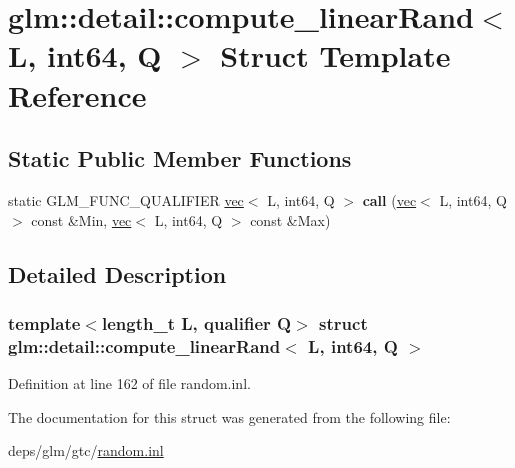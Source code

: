 \hypertarget{structglm_1_1detail_1_1compute__linearRand_3_01L_00_01int64_00_01Q_01_4}{}\section{glm\+:\+:detail\+:\+:compute\+\_\+linear\+Rand$<$ L, int64, Q $>$ Struct Template Reference}
\label{structglm_1_1detail_1_1compute__linearRand_3_01L_00_01int64_00_01Q_01_4}
\subsection*{Static Public Member Functions}
\begin{DoxyCompactItemize}
\item 
\mbox{\label{structglm_1_1detail_1_1compute__linearRand_3_01L_00_01int64_00_01Q_01_4_a228cd2fef53b8af89955bc01dfde047a}} 
static G\+L\+M\+\_\+\+F\+U\+N\+C\+\_\+\+Q\+U\+A\+L\+I\+F\+I\+ER \hyperlink{structglm_1_1vec}{vec}$<$ L, int64, Q $>$ {\bfseries call} (\hyperlink{structglm_1_1vec}{vec}$<$ L, int64, Q $>$ const \&Min, \hyperlink{structglm_1_1vec}{vec}$<$ L, int64, Q $>$ const \&Max)
\end{DoxyCompactItemize}


\subsection{Detailed Description}
\subsubsection*{template$<$length\+\_\+t L, qualifier Q$>$\newline
struct glm\+::detail\+::compute\+\_\+linear\+Rand$<$ L, int64, Q $>$}



Definition at line 162 of file random.\+inl.



The documentation for this struct was generated from the following file\+:\begin{DoxyCompactItemize}
\item 
deps/glm/gtc/\hyperlink{random_8inl}{random.\+inl}\end{DoxyCompactItemize}
